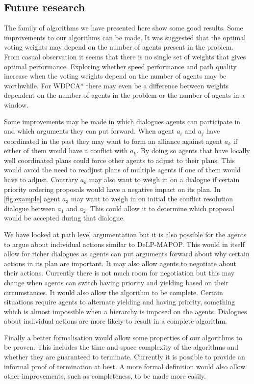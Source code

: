 \subsection{Future research}
The family of algorithms we have presented here show some good results. Some 
improvements to our algorithms can be made. It was suggested that the optimal 
voting weights may depend on the number of agents present in the problem. From 
casual observation it seems that there is no single set of weights that gives 
optimal performance. Exploring whether speed performance and path quality 
increase when the voting weights depend on the number of agents may be 
worthwhile. For WDPCA* there may even be a difference between weights dependent 
on the number of agents in the problem or the number of agents in a window.

Some improvements may be made in which dialogues agents can participate in and 
which arguments they can put forward. When agent $a_i$ and $a_j$ have 
coordinated in the past they may want to form an alliance against agent $a_k$ 
if either of them would have a conflict with $a_k$. By doing so agents that 
have locally well coordinated plans could force other agents to adjust to their 
plans. This would avoid the need to readjust plans of multiple agents if one of 
them would have to adjust. 
Contrary $a_k$ may also 
want to weigh in on a dialogue if certain priority ordering proposals would 
have a negative impact on its plan. In \autoref{fig:example} agent $a_3$ may 
want to weigh in on initial the conflict resolution dialogue between $a_1$ and 
$a_2$. This could allow it to determine which proposal would be accepted during 
that dialogue.

We have looked at path level argumentation but it is also possible for the 
agents to argue about individual actions similar to \textsf{DeLP-MAPOP}. This 
would in itself allow for richer dialogues as agents can put arguments forward 
about why certain actions in its plan are important. It may also allow agents 
to negotiate about their actions. Currently there is not much room for 
negotiation but this may change when agents can switch having priority and 
yielding based on their circumstances. It would also allow the algorithm to be 
complete. Certain situations require agents to alternate yielding and having 
priority, something which is almost impossible when a hierarchy is imposed on 
the agents. Dialogues about individual actions are more likely to result in a 
complete algorithm.

Finally a better formalisation would allow some properties of our algorithms to 
be proven. This includes the time and space complexity of the algorithms and 
whether they are guaranteed to terminate. Currently it is possible to provide 
an informal proof of termination at best. A more formal definition would also 
allow other improvements, such as completeness, to be made more easily.

